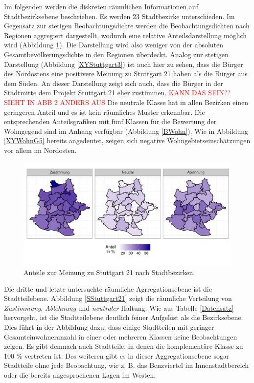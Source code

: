 \documentclass{Vorlage}
\begin{document}
Im folgenden werden die diskreten räumlichen Informationen auf Stadtbezirksebene beschrieben. Es werden 23 Stadtbezirke 
unterschieden. Im Gegensatz zur stetigen Beobachtungsdichte werden die Beobachtungsdichten nach Regionen aggregiert 
dargestellt, wodurch eine relative Anteilsdarstellung möglich wird (Abbildung \ref{BStuttgart21}). Die Darstellung wird 
also weniger von der absoluten Gesamtbevölkerungsdichte in den Regionen überdeckt. Analog zur stetigen Darstellung 
(Abbildung \ref{XYStuttgart3}) ist auch hier zu sehen, dass die Bürger des Nordostens eine positivere Meinung zu 
Stuttgart 21 haben als die Bürger aus dem Süden. An dieser Darstellung zeigt sich auch, dass die Bürger in der 
Stadtmitte dem Projekt Stuttgart 21 eher zustimmen. \textcolor{red}{KANN DAS SEIN?? SIEHT IN ABB 2 ANDERS AUS} Die 
neutrale Klasse hat in allen Bezirken einen geringeren Anteil und es ist kein räumliches Muster erkennbar. Die 
entsprechenden Anteilsgrafiken mit fünf Klassen für die Bewertung der Wohngegend sind im Anhang verfügbar (Abbildung 
\ref{BWohn}). Wie in Abbildung \ref{XYWohnG5} bereits angedeutet, zeigen sich negative Wohngebietseinschätzungen vor 
allem im Nordosten.

\begin{figure}[h]
 \begin{center}
 \includegraphics[scale=0.8]{Pictures/BStuttgart3}
 \caption{Anteile zur Meinung zu Stuttgart 21 nach Stadtbezirken.}
 \label{BStuttgart21}
 \end{center}
\end{figure}

Die dritte und letzte untersuchte räumliche Agrregationsebene ist die Stadtteilebene. Abbildung \ref{SStuttgart21} 
zeigt die räumliche Verteilung von \textit{Zustimmung}, \textit{Ablehnung} und \textit{neutraler} Haltung. Wie aus 
Tabelle \ref{Datensatz} hervorgeht, ist die Stadtteilebene deutlich feiner Aufgelöst als die Bezirksebene. Dies führt in 
der Abbildung dazu, dass einige Stadtteilen mit geringer Gesamteinwohneranzahl in einer oder mehreren Klassen keine 
Beobachtungen zeigen. Es gibt demnach auch Stadtteile, in denen die komplementäre Klasse zu 100 \% vertreten ist. Des 
weiteren gibt es in dieser Aggregationsebene sogar Stadtteile ohne jede Beobachtung, wie z. B. das Benzviertel im 
Innenstadtbereich oder die bereits angesprochenen Lagen im Westen.
\end{document}
